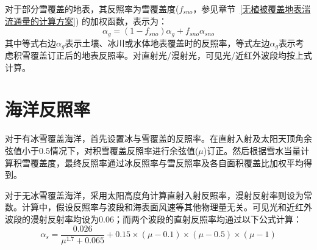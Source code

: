 对于部分雪覆盖的地表，其反照率为雪覆盖度($f_{sno}$，参见章节~\ref{无植被覆盖地表湍流通量的计算方案}) 的加权函数，表示为：
\begin{equation}
\alpha_{g}=\left(1-f_{sno}\right) \alpha_{g} + f_{sno} \alpha_{sno}
\end{equation}
其中等式右边$\alpha_{g}$表示土壤、冰川或水体地表覆盖时的反照率，等式左边$\alpha_{g}$表示考虑积雪覆盖订正后的地表反照率。对直射光/漫射光，可见光/近红外波段均按上式计算。


\section{海洋反照率}\label{海洋反照率}

对于有冰雪覆盖海洋，首先设置冰与雪覆盖的反照率。在直射入射及太阳天顶角余弦值小于0.5情况下，对积雪覆盖反照率进行余弦值($\mu$)订正。然后根据雪水当量计算积雪覆盖度，最终反照率通过冰反照率与雪反照率及各自面积覆盖比加权平均得到。

对于无冰雪覆盖海洋，采用太阳高度角计算直射入射反照率，漫射反射率则设为常数。计算中，假设反照率与波段和海表面风速等其他物理量无关。可见光和近红外波段的漫射反射率均设为0.06；而两个波段的直射反照率均通过以下公式计算：
\begin{equation}
\alpha_{s}= \frac{0.026}{\mu^{1.7}+0.065}+0.15\times(\mu-0.1)\times(\mu-0.5)\times(\mu-1)
\end{equation}


